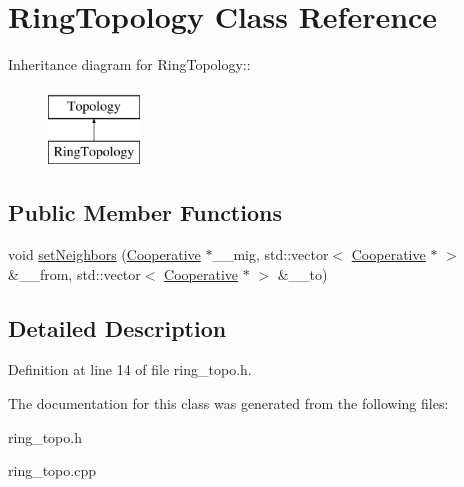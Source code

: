 \hypertarget{classRingTopology}{
\section{Ring\-Topology Class Reference}
\label{classRingTopology}
}
Inheritance diagram for Ring\-Topology::\begin{figure}[H]
\begin{center}
\leavevmode
\includegraphics[height=2cm]{classRingTopology}
\end{center}
\end{figure}
\subsection*{Public Member Functions}
\begin{CompactItemize}
\item 
\hypertarget{classRingTopology_292a7746993788f96042f2f628cfcbc5}{
void \hyperlink{classRingTopology_292a7746993788f96042f2f628cfcbc5}{set\-Neighbors} (\hyperlink{classCooperative}{Cooperative} $\ast$\_\-\_\-mig, std::vector$<$ \hyperlink{classCooperative}{Cooperative} $\ast$ $>$ \&\_\-\_\-from, std::vector$<$ \hyperlink{classCooperative}{Cooperative} $\ast$ $>$ \&\_\-\_\-to)}
\label{classRingTopology_292a7746993788f96042f2f628cfcbc5}

\end{CompactItemize}


\subsection{Detailed Description}




Definition at line 14 of file ring\_\-topo.h.

The documentation for this class was generated from the following files:\begin{CompactItemize}
\item 
ring\_\-topo.h\item 
ring\_\-topo.cpp\end{CompactItemize}
